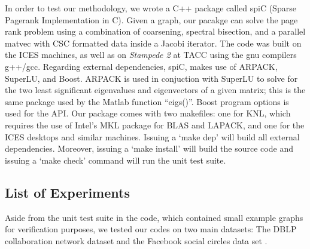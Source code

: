 \documentclass[11pt]{article}
\begin{document}
In order to test our methodology, we wrote a C++
package called {\rm spiC} (Sparse Pagerank Implementation in C). Given a
graph, our pacakge can solve the page rank problem using a combination of coarsening, spectral
bisection, and a parallel matvec with CSC formatted data inside a Jacobi
iterator. The code was built on the ICES machines, as well as on \textit{Stampede 2} at TACC using the gnu
compilers g++/gcc. Regarding external dependencies, {\rm spiC}, makes use of
{\rm ARPACK}, {\rm SuperLU}, and {\rm Boost}. {\rm ARPACK} is used in conjuction
with {\rm SuperLU} to solve for the two least significant eigenvalues and
eigenvectors of a given
matrix; this is the same package used by the Matlab function ``eigs()''. {\rm
Boost} program options is used for the API. Our package comes with two
makefiles: one for KNL, which requires the use of Intel's MKL package for BLAS
and LAPACK, and one for the ICES desktops and similar machines. Issuing a `make
dep' will build all external dependencies. Moreover, issuing a `make install' will
build the source code and issuing a `make check' command will run the unit test suite.  

\subsection{List of Experiments}

Aside from the unit test suite in the code, which contained small example graphs
for verification purposes, we tested our codes on two main datasets: The DBLP
collaboration network dataset and the Facebook social circles data set
\cite{snapnets}.







\newpage



 

\end{document}
